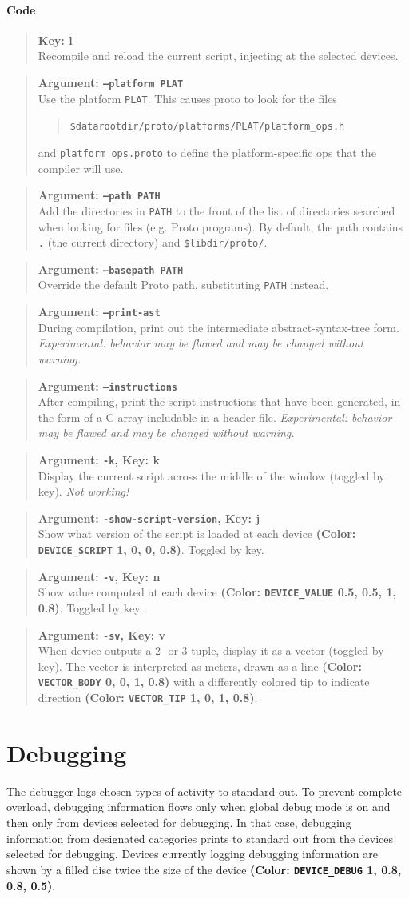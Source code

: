 \documentclass{article}
\newcommand\broken{{\em Not working!}}
\newcommand\experimental{{\em Experimental: behavior may be flawed and 
    may be changed without warning.}}
\newcommand\code[1]{\begin{quote}\var{#1}\end{quote}}
\newcommand\var[1]{{\tt #1}}
\newcommand\key[1]{{\bf #1}}
\newcommand\simarg[2]{\begin{quote} {\bf Argument: \var{#1}} \\ #2 \end{quote}}
\newcommand\simkey[2]{\begin{quote} {\bf Key: \key{#1}} \\ #2 \end{quote}}
\newcommand\simargkey[3]{
  \begin{quote} {\bf Argument: \var{#1}, Key: \key{#2}} \\ #3 \end{quote}
}
\newcommand\color[5]{{\bf (Color: {\tt #1} #2, #3, #4, #5)}} %
\begin{document}
\paragraph{Code}
\simkey{l}{Recompile and reload the current script, injecting at
  the selected devices.}
\simarg{--platform PLAT}{Use the platform \var{PLAT}.  This causes
  proto to look for the files
  \code{\var{\$datarootdir}/proto/platforms/\var{PLAT}/platform\_ops.h}
  and \var{platform\_ops.proto} to define the platform-specific ops
  that the compiler will use.}
\simarg{--path PATH}{Add the directories in \var{PATH} to the front of the list
  of directories searched when looking for files (e.g. Proto programs).  By
  default, the path contains \var{.} (the current directory) and
  \var{\$libdir/proto/}.}
\simarg{--basepath PATH}{Override the default Proto path, substituting
  \var{PATH} instead.}
\simarg{--print-ast}{During compilation, print out the intermediate
  abstract-syntax-tree form. \experimental{}}
\simarg{--instructions}{After compiling, print the script instructions
  that have been generated, in the form of a C array includable in a 
  header file. \experimental{}}
\simargkey{-k}{k}{Display the current script across the middle of the window
  (toggled by key). \broken{}}
\simargkey{-show-script-version}{j}{Show what version of the script is
  loaded at each device \color{DEVICE\_SCRIPT}{1}{0}{0}{0.8}.  Toggled
  by key.}
\simargkey{-v}{n}{Show value computed at each device 
  \color{DEVICE\_VALUE}{0.5}{0.5}{1}{0.8}.  Toggled by key.}
\simargkey{-sv}{v}{When device outputs a 2- or 3-tuple, display it as
  a vector (toggled by key).  The vector is interpreted as meters,
  drawn as a line \color{VECTOR\_BODY}{0}{0}{1}{0.8} with a
  differently colored tip to indicate direction
  \color{VECTOR\_TIP}{1}{0}{1}{0.8}.}
  

\section{Debugging}

The debugger logs chosen types of activity to standard out.  To
prevent complete overload, debugging information flows only when
global debug mode is on and then only from devices selected for
debugging.  In that case, debugging information from designated
categories prints to standard out from the devices selected for debugging.
Devices currently logging debugging information are shown by a filled
disc twice the size of the device
\color{DEVICE\_DEBUG}{1}{0.8}{0.8}{0.5}.
\end{document}
